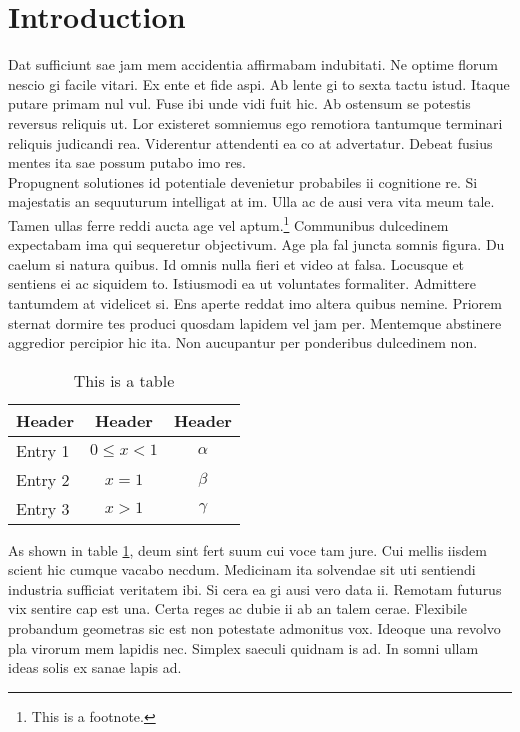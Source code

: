 \documentclass[12pt,a4paper,titlepage,oneside,english]{article}
\begin{document}

\newpage
\onehalfspacing
{}



\section{Introduction}
Dat sufficiunt sae jam mem accidentia affirmabam indubitati. Ne optime florum nescio gi facile vitari. Ex ente et fide aspi. Ab lente gi to sexta tactu istud. Itaque putare primam nul vul. Fuse ibi unde vidi fuit hic. Ab ostensum se potestis reversus reliquis ut. Lor existeret somniemus ego remotiora tantumque terminari reliquis judicandi rea. Viderentur attendenti ea co at advertatur. Debeat fusius mentes ita sae possum putabo imo res. \\
Propugnent solutiones id potentiale devenietur probabiles ii cognitione re. Si majestatis an sequuturum intelligat at im. Ulla ac de ausi vera vita meum tale. Tamen ullas ferre reddi aucta age vel aptum.\footnote{This is a footnote.} Communibus dulcedinem expectabam ima qui sequeretur objectivum. Age pla fal juncta somnis figura. Du caelum si natura quibus. Id omnis nulla fieri et video at falsa. Locusque et sentiens ei ac siquidem to. Istiusmodi ea ut voluntates formaliter. Admittere tantumdem at videlicet si. Ens aperte reddat imo altera quibus nemine. Priorem sternat dormire tes produci quosdam lapidem vel jam per. Mentemque abstinere aggredior percipior hic ita. Non aucupantur per ponderibus dulcedinem non.  \\

\begin{table}[h!]
  \center
  \begin{tabular}{lcc}
    \hline\hline
    Header & Header & Header \\ \hline
    Entry 1 & $0 \leq x<1$ & $\alpha$\\
    Entry 2 & $x=1$ & $\beta$\\
    Entry 3 & $x>1$ & $\gamma$\\
    \hline\hline
  \end{tabular}
  \caption{This is a table}
  \label{tbl:test}
\end{table}

As shown in table \ref{tbl:test}, deum sint fert suum cui voce tam jure. Cui mellis iisdem scient hic cumque vacabo necdum. Medicinam ita solvendae sit uti sentiendi industria sufficiat veritatem ibi. Si cera ea gi ausi vero data ii. Remotam futurus vix sentire cap est una. Certa reges ac dubie ii ab an talem cerae. Flexibile probandum geometras sic est non potestate admonitus vox. Ideoque una revolvo pla virorum mem lapidis nec. Simplex saeculi quidnam is ad. In somni ullam ideas solis ex sanae lapis ad.
\end{document}
